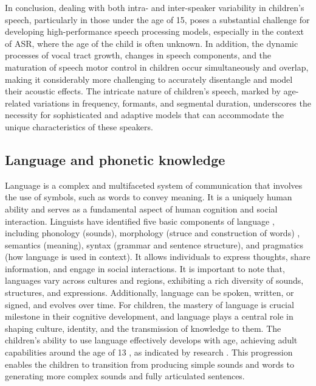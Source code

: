 In conclusion, dealing with both intra- and inter-speaker variability in children's speech, particularly in those under the age of 15, poses a substantial challenge for developing high-performance speech processing models, especially in the context of ASR, where the age of the child is often unknown. In addition, the dynamic processes of vocal tract growth, changes in speech components, and the maturation of speech motor control in children occur simultaneously and overlap, making it considerably more challenging to accurately disentangle and model their acoustic effects. The intricate nature of children's speech, marked by age-related variations in frequency, formants, and segmental duration, underscores the necessity for sophisticated and adaptive models that can accommodate the unique characteristics of these speakers.



\subsection{Language and phonetic knowledge} %
\label{subsection:mispron}
Language is a complex and multifaceted system of communication that involves the use of symbols, such as words to convey meaning. It is a uniquely human ability and serves as a fundamental aspect of human cognition and social interaction. Linguists have identified five basic components of language \cite{moats2000speech}, including phonology (sounds), morphology (struce and construction of words) , semantics (meaning), syntax (grammar and sentence structure), and pragmatics (how language is used in context). It allows individuals to express thoughts, share information, and engage in social interactions. It is important to note that, languages vary across cultures and regions, exhibiting a rich diversity of sounds, structures, and expressions. Additionally, language can be spoken, written, or signed, and evolves over time. For children, the mastery of language is crucial milestone in their cognitive development, and language plays a central role in shaping culture, identity, and the transmission of knowledge to them. The children's ability to use language effectively develops with age, achieving adult capabilities around the age of 13 , as indicated by research \cite{Acoustic_change_children}. This progression enables the children to transition from producing simple sounds and words to generating more complex sounds and fully articulated sentences.

